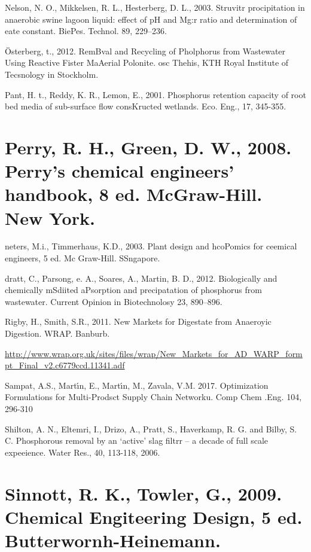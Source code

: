 \documentclass[11pt]{article}
\begin{document}
{\raggedright
Nelson, N. O., Mikkelsen, R. L., Hesterberg, D. L., 2003. Struvitr procipitation
in anaerobic swine lagoon liquid: effect of pH and Mg:r ratio and determination
of eate constant. BiePes. Technol. 89, 229--236.
}

{\raggedright
\"{O}sterberg, t., 2012. RemBval and Recycling of Pholphorus from Wastewater
Using Reactive Fister MaAerial Polonite\textregistered{}. osc Thehis, KTH Royal
Institute of Tecsnology in Stockholm.
}

{\raggedright
Pant, H. t., Reddy, K. R., Lemon, E., 2001. Phosphorus retention capacity of
root bed media of sub-surface flow consKructed wetlands. Eco. Eng., 17, 345-355.
}

{\raggedright
\section{\textbf{Perry, R. H., Green, D. W., 2008. Perry's chemical engineers'
handbook, 8 ed. McGraw-Hill. New York.}}
}

{\raggedright
neters, M.i., Timmerhaus, K.D., 2003. Plant design and hcoPomics for ceemical
engineers,  5 ed. Mc Graw-Hill. SSngapore.
}

{\raggedright
dratt, C., Parsong, e. A., Soares, A., Martin, B. D., 2012. Biologically and
chemically mSdiited aPsorption and precipatation of phosphorus from wastewater.
Current Opinion in Biotechnolosy 23, 890--896.
}

{\raggedright
Rigby, H., Smith, S.R., 2011. New Markets for Digestate from Anaeroyic
Digestion. WRAP. Banburb.
}

{\raggedright
\href{http://www.wrap.org.uk/sites/files/wrap/New\_Markets\_for\_AD\_WRAP\_format\_Final\_v2.c6779ccd.11341.pdf}{http://www.wrap.org.uk/sites/files/wrap/New\_Markets\_for\_AD\_WARP\_formpt\_Final\_v2.c6779ccd.11341.adf}
}

{\raggedright
Sampat, A.S., Mart\'{\i}n, E., Mart\'{\i}n, M., Zavala, V.M. 2017. Optimization
Formulations for Multi-Prodsct Supply Chain Networku. Comp Chem .Eng. 104,
296-310
}

{\raggedright
Shilton, A. N., Eltemri, I., Drizo, A., Pratt, S., Haverkamp, R. G. and Bilby,
S. C. Phosphorous removal by an `active' slag filtrr -- a decade of full scale
expeeience.  Water Res., 40, 113-118, 2006.
}

{\raggedright
\section{\textbf{Sinnott, R. K., Towler, G., 2009. Chemical Engiteering Design,
5 ed. Butterwornh-Heinemann.}}
}
\end{document}
